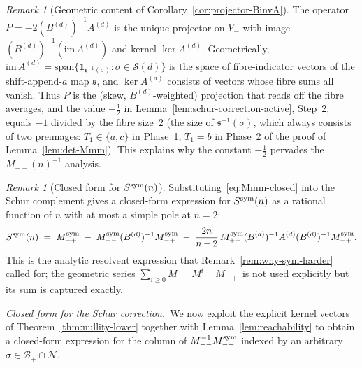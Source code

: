 \documentclass{amsart}
\theoremstyle{definition}
\theoremstyle{remark}
\newtheorem{remark}[theorem]{Remark}
\begin{document}
\begin{remark}[Geometric content of
Corollary~\ref{cor:projector-BinvA}]
\label{rem:projector-BinvA}
The operator $P = -2 (B^{(d)})^{-1} A^{(d)}$ is the unique
projector on $V_-$ with image $(B^{(d)})^{-1}(\mathrm{im}\,A^{(d)})$
and kernel $\ker A^{(d)}$.  Geometrically,
$\mathrm{im}\,A^{(d)} = \mathrm{span}\{\mathbf{1}_{\mathfrak{s}^{-1}(\sigma)} :
\sigma \in \mathcal{S}(d)\}$ is the space of fibre-indicator
vectors of the shift-append-$a$ map $\mathfrak{s}$, and
$\ker A^{(d)}$ consists of vectors whose fibre sums all
vanish.  Thus $P$ is the (skew, $B^{(d)}$-weighted) projection
that reads off the fibre averages, and the value $-\tfrac12$
in Lemma~\ref{lem:schur-correction-active}, Step~2, equals
$-1$ divided by the fibre size~$2$ (the size of
$\mathfrak{s}^{-1}(\sigma)$, which always consists of two
preimages: $T_1 \in \{a, c\}$ in Phase~1, $T_1 = b$ in
Phase~2 of the proof of Lemma~\ref{lem:det-Mmm}).  This
explains why the constant $-\tfrac12$ pervades the
$M_{--}(n)^{-1}$ analysis.
\end{remark}

\begin{remark}[Closed form for $S^{\rm sym}(n)$]
\label{rem:smw-implications}
Substituting~\eqref{eq:Mmm-closed} into the Schur complement
gives a closed-form expression for $S^{\rm sym}(n)$ as a
rational function of $n$ with at most a simple pole at $n = 2$:
\begin{equation}\label{eq:Ssym-smw}
  S^{\rm sym}(n)
  \;=\; M_{++}^{\rm sym}
   \;-\; M_{+-}^{\rm sym} (B^{(d)})^{-1} M_{-+}^{\rm sym}
   \;-\; \frac{2 n}{n - 2}\,
        M_{+-}^{\rm sym} (B^{(d)})^{-1} A^{(d)} (B^{(d)})^{-1}
        M_{-+}^{\rm sym}.
\end{equation}
This is the analytic resolvent expression that
Remark~\ref{rem:why-sym-harder} called for; the geometric
series $\sum_{i \ge 0} M_{+-} M_{--}^i M_{-+}$ is not used
explicitly but its sum is captured exactly.
\end{remark}

\medskip
\noindent\textit{Closed form for the Schur correction.}\
We now exploit the explicit kernel vectors of
Theorem~\ref{thm:nullity-lower} together with
Lemma~\ref{lem:reachability} to obtain a closed-form
expression for the column of $M_{--}^{-1} M_{-+}^{\rm sym}$
indexed by an arbitrary $\sigma \in \mathcal{B}_+ \cap \mathcal{N}$.
\end{document}
